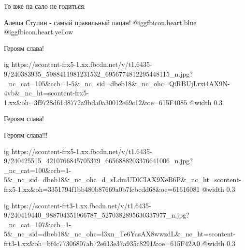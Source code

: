 То вже на сало не годиться. 🤮

 
Алеша Ступин - самый правильный пацан!  @igg{fbicon.heart.blue}  @igg{fbicon.heart.yellow} 

 
Героям слава!

\ifcmt
  ig https://scontent-frx5-1.xx.fbcdn.net/v/t1.6435-9/240383935_5988411981231532_6956774812295448115_n.jpg?_nc_cat=105&ccb=1-5&_nc_sid=dbeb18&_nc_ohc=QiRBUjLrxi4AX9N-4vb&_nc_ht=scontent-frx5-1.xx&oh=3f9728d61d8772a9bda0a30012e69c12&oe=615F4085
  @width 0.3
\fi

 
Героям слава!

 
Героям слава!!!

\ifcmt
  ig https://scontent-frx5-1.xx.fbcdn.net/v/t1.6435-9/240425515_4210766845705379_6656888203376641006_n.jpg?_nc_cat=100&ccb=1-5&_nc_sid=dbeb18&_nc_ohc=d_sLdmUDlCIAX9XeB6P&_nc_ht=scontent-frx5-1.xx&oh=3351794f1bb480b87669a0b7fcbcdd68&oe=61616081
  @width 0.3
\fi

 

\ifcmt
  ig https://scontent-frt3-1.xx.fbcdn.net/v/t1.6435-9/240419440_988704351966787_5270382895630337977_n.jpg?_nc_cat=107&ccb=1-5&_nc_sid=dbeb18&_nc_ohc=l3xn_Te6YasAX8wwzdL&_nc_ht=scontent-frt3-1.xx&oh=bf4c77306807ab72e613e37a935c8291&oe=615F42A0
  @width 0.3
\fi

